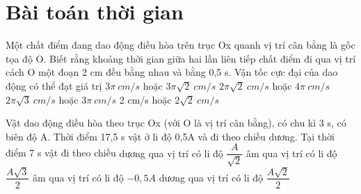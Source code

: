 \section{Bài toán thời gian}
\begin{ex}%
Một chất điểm đang dao động điều hòa trên trục Ox quanh vị trí cân bằng là gốc tọa độ O. Biết rằng khoảng thời gian giữa hai lần liên tiếp chất điểm đi qua vị trí cách O một đoạn 2 cm đều bằng nhau và bằng 0,5 s. Vận tốc cực đại của dao động có thể đạt giá trị
\choice
{$3\pi\ cm/s$ hoặc $3\pi\sqrt{2}\ cm/s$}
{\True $2\pi \sqrt{2}\ cm/s$ hoặc $4\pi\ cm/s$}
{$2\pi\sqrt{3}\ cm/s$ hoặc $3\pi\ cm/s$}
{2 cm/s hoặc $2\sqrt{2}\ cm/s$}
\end{ex} 
\begin{ex}%
Vật dao động điều hòa theo trục Ox (với O là vị trí cân bằng), có chu kì 3 s, có biên độ A. Thời điểm 17,5 s vật ở li độ 0,5A và đi theo chiều dương. Tại thời điểm 7 s vật đi theo chiều
\choice
{dương qua vị trí có li độ $\dfrac{A}{\sqrt{2}}$}
{âm qua vị trí có li độ  $\dfrac{A\sqrt{3}}{2}$}
{\True âm qua vị trí có li độ $-0,5A$}
{dương qua vị trí có li độ  $\dfrac{A\sqrt{2}}{2}$}
\end{ex} 
